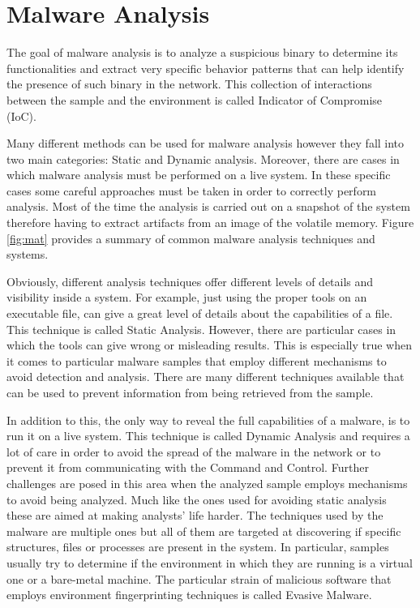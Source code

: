 
\chapter{Malware Analysis}
\label{chap:2}


The goal of malware analysis is to analyze a suspicious binary to determine its functionalities and extract very specific behavior patterns that can help identify the presence of such binary in the network. This collection of interactions between the sample and the environment is called Indicator of Compromise (IoC).

Many different methods can be used for malware analysis however they fall into two main categories: Static and Dynamic analysis. Moreover, there are cases in which malware analysis must be performed on a live system. In these specific cases some careful approaches must be taken in order to correctly perform analysis. Most of the time the analysis is carried out on a snapshot of the system therefore having to extract artifacts from an image of the volatile memory. Figure \ref{fig:mat} provides a summary of common malware analysis techniques and systems.%

Obviously, different analysis techniques offer different levels of details and visibility inside a system. For example, just using the proper tools on an executable file, can give a great level of details about the capabilities of a file. This technique is called Static Analysis. However, there are particular cases in which the tools can give wrong or misleading results. This is especially true when it comes to particular malware samples that employ different mechanisms to avoid detection and analysis. There are many different techniques available that can be used to prevent information from being retrieved from the sample.  

In addition to this, the only way to reveal the full capabilities of a malware, is to run it on a live system. This technique is called Dynamic Analysis and requires a lot of care in order to avoid the spread of the malware in the network or to prevent it from communicating with the Command and Control. Further challenges are posed in this area when the analyzed sample employs mechanisms to avoid being analyzed. Much like the ones used for avoiding static analysis these are aimed at making analysts' life harder. The techniques used by the malware are multiple ones but all of them are targeted at discovering if specific structures, files or processes are present in the system. In particular, samples usually try to determine if the environment in which they are running is a virtual one or a bare-metal machine. The particular strain of malicious software that employs environment fingerprinting techniques is called Evasive Malware. 

